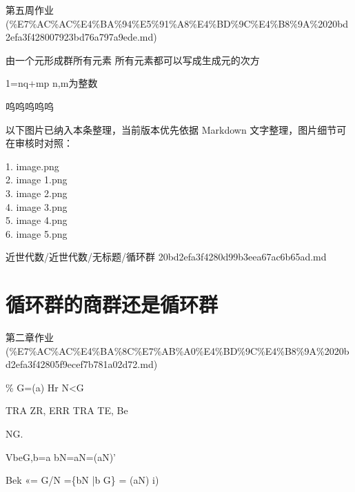 \begin{note}[来源上级主题]

第五周作业 (\%E7\%AC\%AC\%E4\%BA\%94\%E5\%91\%A8\%E4\%BD\%9C\%E4\%B8\%9A\%2020bd2efa3f428007923bd76a797a9ede.md)

\end{note}

\begin{homework}

由一个元形成群所有元素 所有元素都可以写成生成元的次方

1=nq+mp n,m为整数

呜呜呜呜呜

\end{homework}

\begin{note}[关联图片]
以下图片已纳入本条整理，当前版本优先依据 Markdown 文字整理，图片细节可在审核时对照：

1. image.png\\
2. image 1.png\\
3. image 2.png\\
4. image 3.png\\
5. image 4.png\\
6. image 5.png\\

\end{note}

\begin{note}[来源路径]

近世代数/近世代数/无标题/循环群 20bd2efa3f4280d99b3eea67ac6b65ad.md

\end{note}

\section*{循环群的商群还是循环群}

\begin{note}[来源上级主题]

第二章作业 (\%E7\%AC\%AC\%E4\%BA\%8C\%E7\%AB\%A0\%E4\%BD\%9C\%E4\%B8\%9A\%2020bd2efa3f42805f9ecef7b781a02d72.md)

\end{note}

\begin{homework}

\% G=(a) Hr N<G

TRA ZR, ERR TRA TE, Be

NG.

VbeG,b=a bN=aN=(aN)’

Bek «= G/N =\{bN |b G\} = (aN) i)

\end{homework}

